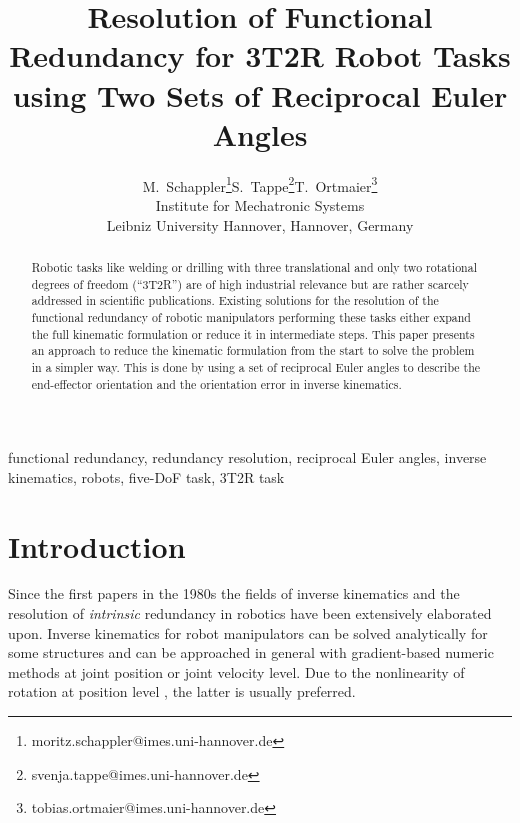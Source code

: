 \documentclass[twocolumn,10pt]{IFTOMM}
\begin{document}
\def\papernumber{IK xxx}
\def\conference_name{15th IFToMM World Congress, Krakow, Poland, 30 June--4 July, 2019}
\title{Resolution of Functional Redundancy for 3T2R Robot Tasks  \\ using Two Sets of Reciprocal Euler Angles}

\author{
    \begin{tabular}{cccc}
    M.\ Schappler\thanks{moritz.schappler@imes.uni-hannover.de}
& S.\ Tappe\thanks{svenja.tappe@imes.uni-hannover.de}
& T.\ Ortmaier\thanks{tobias.ortmaier@imes.uni-hannover.de}\\
    \multicolumn{3}{c}{Institute for Mechatronic Systems} \\
    \multicolumn{3}{c}{Leibniz University Hannover, Hannover, Germany}
    \end{tabular}
}

\maketitle

\begin{abstract}
Robotic tasks like welding or drilling with three translational and only two rotational degrees of freedom (``3T2R'') are of high industrial relevance but are ra\-ther scarcely addressed in scientific publications.
Existing solutions for the resolution of the functional redundancy of robotic manipulators performing these tasks either expand the full kinematic formulation or reduce it in intermediate steps.
This paper presents an approach to reduce the kinematic formulation from the start to solve the problem in a simpler way.
This is done by using a set of reciprocal Euler angles to describe the end-effector orientation and the orientation error in inverse kinematics.
\end{abstract}

\begin{keywords}
functional redundancy, redundancy resolution, reciprocal Euler angles, inverse kinematics, robots, five-DoF task, 3T2R task
\end{keywords}

\section{Introduction}
\label{sec:Intro}
Since the first papers in the 1980s the fields of inverse kinematics \cite{GoldenbergBenFen1985} and the resolution of \emph{intrinsic} redundancy \cite{Yoshikawa1984} in robotics have been extensively elaborated upon.
Inverse kinematics for robot manipulators can be solved analytically for some structures and can be approached in general with gradient-based numeric methods at  joint position or joint velocity level.
Due to the nonlinearity of rotation at position level \cite{GoldenbergBenFen1985}, the latter is usually preferred.
\end{document}
